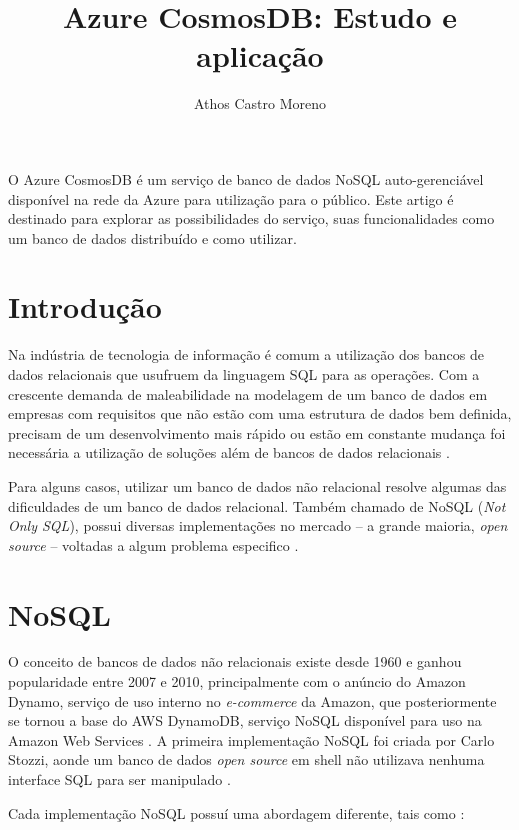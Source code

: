 \documentclass[12pt]{article}
\title{Azure CosmosDB: Estudo e aplicação}
\author{Athos Castro Moreno}
\begin{document}
 
\maketitle

\begin{resumo} 
	O Azure CosmosDB é um serviço de banco de dados NoSQL auto-gerenciável disponível na rede da Azure para utilização para o público. Este artigo é destinado para explorar as possibilidades
	do serviço, suas funcionalidades como um banco de dados distribuído e como utilizar. 
\end{resumo}

\section{Introdução}
Na indústria de tecnologia de informação é comum a utilização dos bancos de dados relacionais que usufruem da linguagem SQL para as operações. Com a crescente demanda
de maleabilidade na modelagem de um banco de dados em empresas com requisitos que não estão com uma estrutura de dados bem definida, precisam de um desenvolvimento mais rápido
ou estão em constante mudança foi necessária a utilização de soluções além de bancos de dados relacionais \cite{Oliveira2011}.

Para alguns casos, utilizar um banco de dados não relacional resolve algumas das dificuldades de um banco de dados relacional. Também chamado de NoSQL (\textit{Not Only SQL}),
possui diversas implementações no mercado -- a grande maioria, \textit{open source} -- voltadas a algum problema especifico \cite{Pokorny2013}.

\section{NoSQL}
O conceito de bancos de dados não relacionais existe desde 1960 e ganhou popularidade entre 2007 e 2010, principalmente com o anúncio do Amazon Dynamo, serviço de uso interno no \textit{e-commerce}
da Amazon, que posteriormente se tornou a base do AWS DynamoDB, serviço NoSQL disponível para uso na Amazon Web Services \cite{DeCandia2007}.
A primeira implementação NoSQL foi criada por Carlo Stozzi, aonde um banco de dados \textit{open source} em shell não utilizava nenhuma interface SQL para ser manipulado \cite{Lith2010}. 

Cada implementação NoSQL possuí uma abordagem diferente, tais como \cite{Lith2010} \cite{Leavitt2010}:
\end{document}
